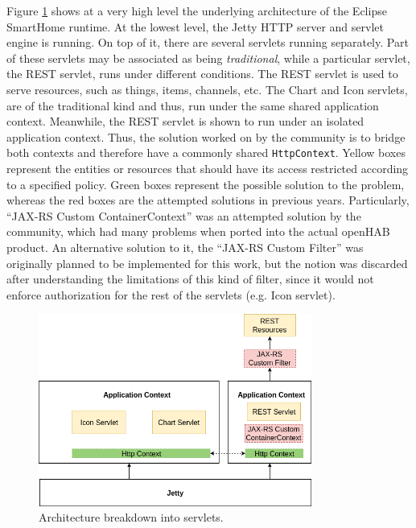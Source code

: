 \documentclass[12pt]{article}
\begin{document}
Figure \ref{fig:esh_auth_arch} shows at a very high level the underlying architecture of the Eclipse SmartHome runtime. At the lowest level, the Jetty HTTP server and servlet engine is running. On top of it, there are several servlets running separately. Part of these servlets may be associated as being \emph{traditional}, while a particular servlet, the REST servlet, runs under different conditions. The REST servlet is used to serve resources, such as things, items, channels, etc. The Chart and Icon servlets, are of the traditional kind and thus, run under the same shared application context. Meanwhile, the REST servlet is shown to run under an isolated application context. Thus, the solution worked on by the community is to bridge both contexts and therefore have a commonly shared \texttt{HttpContext}. Yellow boxes represent the entities or resources that should have its access restricted according to a specified policy. Green boxes represent the possible solution to the problem, whereas the red boxes are the attempted solutions in previous years. Particularly, ``JAX-RS Custom ContainerContext'' was an attempted solution by the community, which had many problems when ported into the actual openHAB product. An alternative solution to it, the ``JAX-RS Custom Filter'' was originally planned to be implemented for this work, but the notion was discarded after understanding the limitations of this kind of filter, since it would not enforce authorization for the rest of the servlets (e.g. Icon servlet). 

\begin{figure} [ht] 
\begin{center}
\includegraphics[width=0.8\textwidth]{esh_auth_arch}
\caption{Architecture breakdown into servlets.}
\label{fig:esh_auth_arch}
\end{center}
\end{figure}
\end{document}
